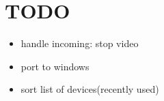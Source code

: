 \documentclass[ddc nogerman]{tudbeamer}
\begin{document}
\section{TODO}
\begin{frame}
    \begin{itemize}
        \item handle incoming: stop video
        \item port to windows
        \item sort list of devices(recently used)
    \end{itemize}
\end{frame}
\end{document}
